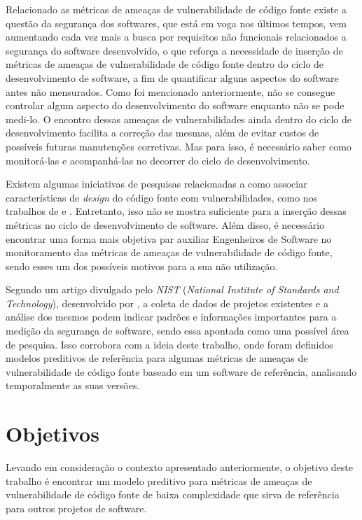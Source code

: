 Relacionado as métricas de ameaças de vulnerabilidade de código fonte existe a
questão da segurança dos softwares, que está em voga nos últimos tempos,
vem aumentando cada vez mais a busca por requisitos não funcionais relacionados a
segurança do software desenvolvido, o que reforça a necessidade de inserção de
métricas de ameaças de vulnerabilidade de código fonte dentro do ciclo de
desenvolvimento de software, a fim de quantificar alguns aspectos do software
antes não mensurados. Como foi mencionado anteriormente, não se consegue
controlar algum aspecto do desenvolvimento do software enquanto não se pode
medi-lo. O encontro dessas ameaças de vulnerabilidades ainda dentro do ciclo de
desenvolvimento facilita a correção das mesmas, além de evitar custos de
possíveis futuras manutenções corretivas. Mas para isso, é necessário saber como
monitorá-las e acompanhá-las no decorrer do ciclo de desenvolvimento.

Existem algumas iniciativas de pesquisas relacionadas a como associar
características de \textit{design} do código fonte com vulnerabilidades, como
nos trabalhos de  e
. Entretanto, isso não se mostra suficiente para a
inserção dessas métricas no ciclo de desenvolvimento de software. Além disso, é
necessário encontrar uma forma mais objetiva par auxiliar Engenheiros de
Software no monitoramento das métricas de ameaças de vulnerabilidade de código
fonte, sendo esses um dos possíveis motivos para a sua não utilização.

Segundo um artigo divulgado pelo \textit{NIST} (\textit{National Institute of
Standards and Technology}), desenvolvido por , a coleta
de dados de projetos existentes e a análise dos mesmos podem indicar padrões e
informações importantes para a medição da segurança de software, sendo essa
apontada como uma possível área de pesquisa. Isso corrobora com a ideia deste
trabalho, onde foram definidos modelos preditivos de referência para algumas
métricas de ameaças de vulnerabilidade de código fonte baseado em um software de
referência, analisando temporalmente as suas versões.


\section{Objetivos} \label{sec:objetivos}

Levando em consideração o contexto apresentado anteriormente, o objetivo deste
trabalho é encontrar um modelo preditivo para métricas de ameaças de
vulnerabilidade de código fonte de baixa complexidade que sirva de referência
para outros projetos de software.

